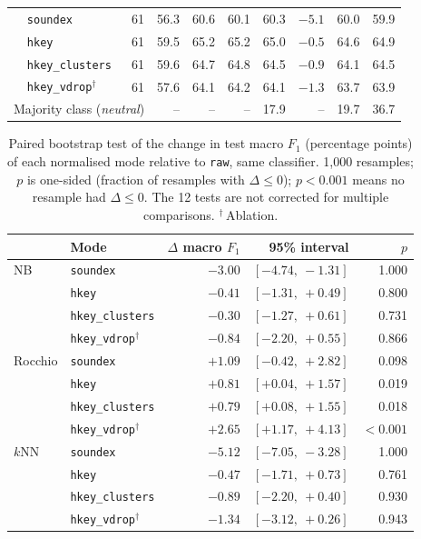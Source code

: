\begin{table}[t]
\begin{tabular}{llrrrrrrrr}
        & \texttt{soundex}        & 61  & 56.3 & 60.6 & 60.1 & 60.3 & $-5.1$ & 60.0 & 59.9 \\
        & \texttt{hkey}           & 61  & 59.5 & 65.2 & 65.2 & 65.0 & $-0.5$ & 64.6 & 64.9 \\
        & \texttt{hkey\_clusters} & 61  & 59.6 & 64.7 & 64.8 & 64.5 & $-0.9$ & 64.1 & 64.5 \\
        & \texttt{hkey\_vdrop}$^\dagger$ & 61 & 57.6 & 64.1 & 64.2 & 64.1 & $-1.3$ & 63.7 & 63.9 \\
\midrule
\multicolumn{3}{l}{Majority class (\emph{neutral})} & -- & -- & -- & 17.9 & -- & 19.7 & 36.7 \\
\bottomrule
\end{tabular}
\end{table}

\begin{table}[t]
\centering
\small
\caption{Paired bootstrap test of the change in test macro $F_1$ (percentage points) of each
normalised mode relative to \texttt{raw}, same classifier. 1{,}000 resamples; $p$ is one-sided
(fraction of resamples with $\Delta\le 0$); $p<0.001$ means no resample had $\Delta\le 0$. The
12 tests are not corrected for multiple comparisons. $^\dagger$\,Ablation.}
\label{tab:e2-boot}
\begin{tabular}{llrrr}
\toprule
 & Mode & $\Delta$ macro $F_1$ & 95\% interval & $p$ \\
\midrule
NB      & \texttt{soundex}        & $-3.00$ & $[-4.74,\ -1.31]$ & 1.000 \\
        & \texttt{hkey}           & $-0.41$ & $[-1.31,\ +0.49]$ & 0.800 \\
        & \texttt{hkey\_clusters} & $-0.30$ & $[-1.27,\ +0.61]$ & 0.731 \\
        & \texttt{hkey\_vdrop}$^\dagger$ & $-0.84$ & $[-2.20,\ +0.55]$ & 0.866 \\
\midrule
Rocchio & \texttt{soundex}        & $+1.09$ & $[-0.42,\ +2.82]$ & 0.098 \\
        & \texttt{hkey}           & $+0.81$ & $[+0.04,\ +1.57]$ & 0.019 \\
        & \texttt{hkey\_clusters} & $+0.79$ & $[+0.08,\ +1.55]$ & 0.018 \\
        & \texttt{hkey\_vdrop}$^\dagger$ & $+2.65$ & $[+1.17,\ +4.13]$ & $<0.001$ \\
\midrule
$k$NN   & \texttt{soundex}        & $-5.12$ & $[-7.05,\ -3.28]$ & 1.000 \\
        & \texttt{hkey}           & $-0.47$ & $[-1.71,\ +0.73]$ & 0.761 \\
        & \texttt{hkey\_clusters} & $-0.89$ & $[-2.20,\ +0.40]$ & 0.930 \\
        & \texttt{hkey\_vdrop}$^\dagger$ & $-1.34$ & $[-3.12,\ +0.26]$ & 0.943 \\
\bottomrule
\end{tabular}
\end{table}


